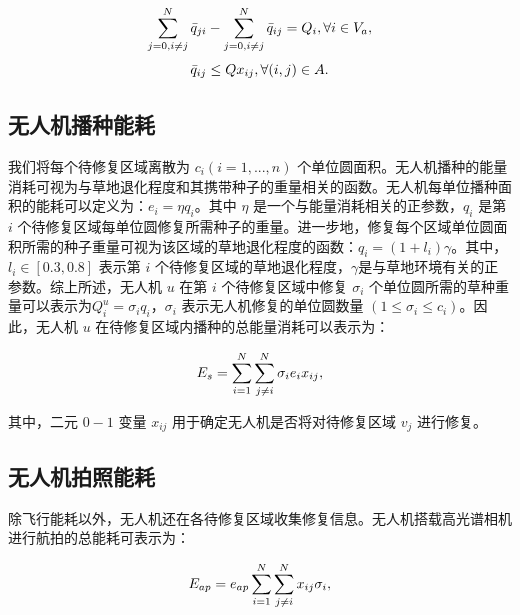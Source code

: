 \documentclass[AutoFakeBold]{LZUThesis}
\begin{document}
\begin{equation} \label{remained-weight}
	\begin{scriptsize}
		\sum^N_{j=0, i\neq j}\bar{q}_{ji} -  \sum^N_{j=0, i\neq j}\bar{q}_{ij} = Q_i, \forall i \in V_a,
	\end{scriptsize}
\end{equation}
\begin{equation} \label{demanded-weight}
	\begin{small}
		\bar{q}_{ij} \leq Q x_{ij}, \forall (i,j) \in A.
	\end{small}
\end{equation}

\subsection{无人机播种能耗}

我们将每个待修复区域离散为 $c_i(i = 1, ..., n)$ 个单位圆面积。无人机播种的能量消耗可视为与草地退化程度和其携带种子的重量相关的函数。无人机每单位播种面积的能耗可以定义为：$e_i = \eta q_i$。其中 $\eta$ 是一个与能量消耗相关的正参数，$q_i$ 是第 $i$ 个待修复区域每单位圆修复所需种子的重量。进一步地，修复每个区域单位圆面积所需的种子重量可视为该区域的草地退化程度的函数\cite{klaus2017enriching}：$q_i = (1 + l_i) \gamma$。其中，$l_i \in [0.3, 0.8]$ 表示第 $i$ 个待修复区域的草地退化程度，$\gamma$是与草地环境有关的正参数。综上所述，无人机 $u$ 在第 $i$ 个待修复区域中修复 $\sigma_i$ 个单位圆所需的草种重量可以表示为$Q^u_i = \sigma_i q_i$，$\sigma_i$ 表示无人机修复的单位圆数量 $(1\leq\sigma_i\leq c_i)$。因此，无人机 $u$ 在待修复区域内播种的总能量消耗可以表示为：

\begin{equation} \label{seeding-energy}
	\begin{small}
		E_s = \sum^N_{i = 1}\sum^N_{j \neq i}\sigma_i e_i x_{ij},
	\end{small}
\end{equation}

其中，二元 $0-1$ 变量 $x_{ij}$ 用于确定无人机是否将对待修复区域 $v_j$ 进行修复。

\subsection{无人机拍照能耗}

除飞行能耗以外，无人机还在各待修复区域收集修复信息。无人机搭载高光谱相机进行航拍的总能耗可表示为：

\begin{equation} \label{hyper-spectral-camera-energy}
	\begin{scriptsize}
		E_{ap} = e_{ap}\sum^N_{i=1}\sum^N_{j \neq i} x_{ij}\sigma_i,
	\end{scriptsize}
\end{equation}
\end{document}
